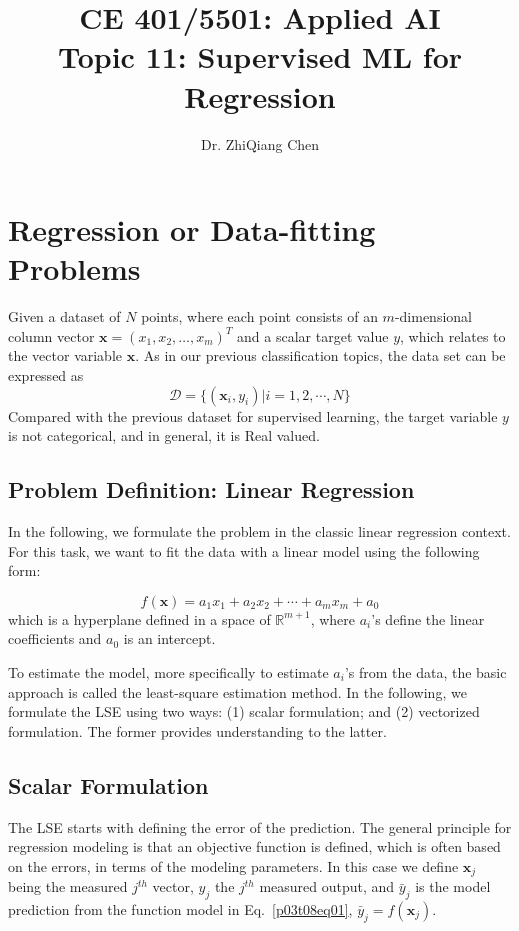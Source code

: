 \documentclass[12pt]{article}
\begin{document}
\doublespacing	

\title{CE 401/5501: Applied AI \\ \large Topic 11: Supervised ML for Regression}
\author{Dr. ZhiQiang Chen}
\date{}
\maketitle

\section{Regression or Data-fitting Problems}
Given a dataset of $N$ points, where each point consists of an $m$-dimensional column vector $\mathbf{x} = (x_1, x_2, \dots, x_m)^T$ and a scalar target value $y$, which relates to the vector variable $\mathbf{x}$. As in our previous classification topics, the data set can be expressed as
\[
\mathcal{D} = \{ (\mathbf{x}_i, y_i) | i = 1, 2, \cdots, N\}
\]
Compared with the previous dataset for supervised learning, the target variable $y$ is not categorical, and in general, it is Real valued. 

\subsection{Problem Definition: Linear Regression}

In the following, we formulate the problem in the classic linear regression context. For this task, we want to fit the data with a linear model using the following form:

\begin{equation}
f(\mathbf{x}) = a_1 x_1 + a_2 x_2 + \cdots + a_m x_m + a_0
\label{p03t08eq01}
\end{equation}
which is a hyperplane defined in a space of $\mathbb{R}^{m+1}$, where $a_i$'s define the linear coefficients and $a_0$ is an intercept. 

To estimate the model, more specifically to estimate $a_i$'s from the data, the basic approach is called the least-square estimation method. In the following, we formulate the LSE using two ways: (1) scalar formulation; and (2) vectorized formulation. The former provides understanding to the latter.

\subsection{Scalar Formulation}
The LSE starts with defining the error of the prediction. The general principle for regression modeling is that an objective function is defined, which is often based on the errors, in terms of the modeling parameters. In this case we define $\mathbf{x}_j$ being the measured $j^{th}$ vector, $y_j$ the $j^{th}$ measured output, and $\bar{y}_j$ is the model prediction from the function model in Eq.~\ref{p03t08eq01}, $\bar{y}_j = f(\mathbf{x}_j)$. 
\end{document}
